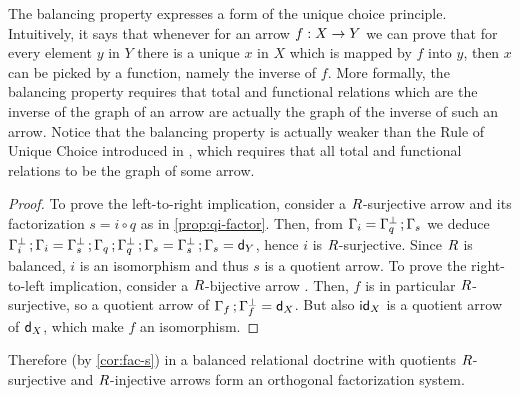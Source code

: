 \begin{remark} 
The balancing property expresses a form of the unique choice principle. 
Intuitively, it says that whenever for an arrow $\fun{f}{X}{Y}$ we can prove that for every element $y$ in $Y$ there is a unique $x$ in $X$ which is mapped by $f$ into $y$, then $x$ can be picked by a function, namely the inverse of $f$. 
More formally, the balancing property requires that total and functional relations
which are the inverse of the graph of an arrow are actually
the graph of the inverse of such an arrow. 
% 
Notice that the balancing property is actually weaker than the Rule of Unique Choice introduced in \cite{DagninoP25tac}, which requires that all total and functional relations to be the graph of some arrow. 
\end{remark}
 

\begin{proof}
To prove the left-to-right implication, consider a $R$-surjective arrow  and its factorization $s = i\circ q$ as in \cref{prop:qi-factor}. 
Then, from $\Gamma_{i} = \Gamma_{q}^{\bot}\mathop{\mathbf{;}}\Gamma_{s}$ we deduce 
$ \Gamma_{i}^{\bot}\mathop{\mathbf{;}}\Gamma_{i} 
  = \Gamma_{s}^{\bot}\mathop{\mathbf{;}}\Gamma_{q}\mathop{\mathbf{;}}\Gamma_{q}^{\bot}\mathop{\mathbf{;}}\Gamma_{s} 
  = \Gamma_{s}^{\bot}\mathop{\mathbf{;}}\Gamma_{s} 
  = \mathsf{d}_Y$, 
hence $i$ is $R$-surjective. 
Since $R$ is balanced, $i$ is an isomorphism and thus $s$ is a quotient arrow. To prove the right-to-left implication, consider a $R$-bijective arrow . 
Then, $f$ is in particular $R$-surjective, so a quotient arrow of $\Gamma_{f}\mathop{\mathbf{;}}\Gamma_{f}^{\bot} = \mathsf{d}_X$. But also $\mathsf{id}_X$ is a quotient arrow of $\mathsf{d}_X$, which make $f$ an isomorphism.
\end{proof}

Therefore (by \cref{cor:fac-s}) in a balanced relational doctrine with quotients 
$R$-surjective and $R$-injective arrows form an orthogonal factorization system. 

